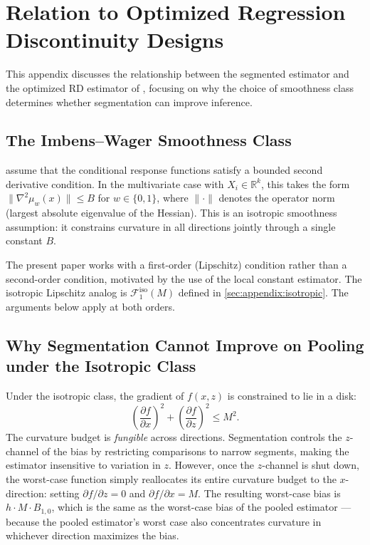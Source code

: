 \section{Relation to Optimized Regression Discontinuity Designs}\label{sec:appendix:iw}

This appendix discusses the relationship between the segmented estimator and the optimized RD estimator of \textcite{imbens_optimized_2019}, focusing on why the choice of smoothness class determines whether segmentation can improve inference.


\subsection*{The Imbens--Wager Smoothness Class}

\textcite{imbens_optimized_2019} assume that the conditional response functions satisfy a bounded second derivative condition.
In the multivariate case with $X_i \in \mathbb{R}^k$, this takes the form $\|\nabla^2 \mu_w(x)\| \leq B$ for $w \in \{0,1\}$, where $\|\cdot\|$ denotes the operator norm (largest absolute eigenvalue of the Hessian).
This is an isotropic smoothness assumption: it constrains curvature in all directions jointly through a single constant $B$.

The present paper works with a first-order (Lipschitz) condition rather than a second-order condition, motivated by the use of the local constant estimator.
The isotropic Lipschitz analog is $\mathcal{F}_1^{\mathrm{iso}}(M)$ defined in \cref{sec:appendix:isotropic}.
The arguments below apply at both orders.


\subsection*{Why Segmentation Cannot Improve on Pooling under the Isotropic Class}

Under the isotropic class, the gradient of $f(x,z)$ is constrained to lie in a disk:
\begin{equation*}
	\left(\frac{\partial f}{\partial x}\right)^2 + \left(\frac{\partial f}{\partial z}\right)^2 \leq M^2.
\end{equation*}
The curvature budget is \emph{fungible} across directions.
Segmentation controls the $z$-channel of the bias by restricting comparisons to narrow segments, making the estimator insensitive to variation in $z$.
However, once the $z$-channel is shut down, the worst-case function simply reallocates its entire curvature budget to the $x$-direction: setting $\partial f / \partial z = 0$ and $\partial f / \partial x = M$.
The resulting worst-case bias is $h \cdot M \cdot B_{1,0}$, which is the same as the worst-case bias of the pooled estimator --- because the pooled estimator's worst case also concentrates curvature in whichever direction maximizes the bias.

